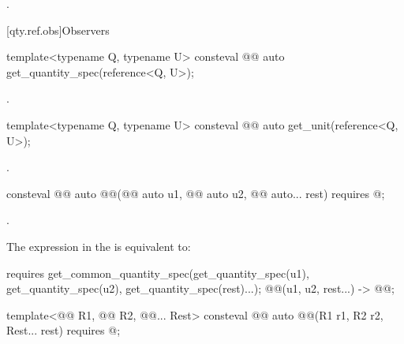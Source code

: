\begin{itemdescr}
\pnum
\returns
{}.
\end{itemdescr}

[qty.ref.obs]{Observers}

\begin{itemdecl}
template<typename Q, typename U>
consteval @@ auto get_quantity_spec(reference<Q, U>);
\end{itemdecl}

\begin{itemdescr}
\pnum
\returns
{}.
\end{itemdescr}

\begin{itemdecl}
template<typename Q, typename U>
consteval @@ auto get_unit(reference<Q, U>);
\end{itemdecl}

\begin{itemdescr}
\pnum
\returns
{}.
\end{itemdescr}

\begin{itemdecl}
consteval @@ auto @@(@@ auto u1, @@ auto u2,
                                                       @@ auto... rest)
  requires @\seebelownc@;
\end{itemdecl}

\begin{itemdescr}
\pnum
\returns
{}.

\pnum
\remarks
The expression in the  is equivalent to:
\begin{codeblock}
requires {
  get_common_quantity_spec(get_quantity_spec(u1), get_quantity_spec(u2),
                           get_quantity_spec(rest)...);
  { @@(u1, u2, rest...) } -> @@;
}
\end{codeblock}
\end{itemdescr}

\begin{itemdecl}
template<@@ R1, @@ R2, @@... Rest>
consteval @@ auto @@(R1 r1, R2 r2, Rest... rest)
  requires @\seebelownc@;
\end{itemdecl}

